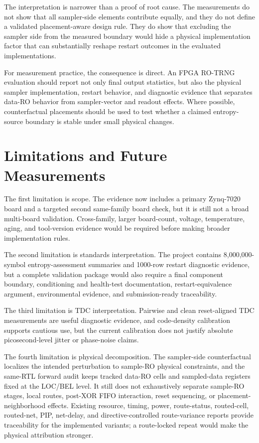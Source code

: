 \documentclass[journal]{IEEEtran}
\newcommand{\rotrng}{RO-TRNG}
\newcommand{\tdc}{TDC}
\begin{document}
The interpretation is narrower than a proof of root cause. The measurements do not show that all sampler-side elements contribute equally, and they do not define a validated placement-aware design rule. They do show that excluding the sampler side from the measured boundary would hide a physical implementation factor that can substantially reshape restart outcomes in the evaluated implementations.

For measurement practice, the consequence is direct. An FPGA \rotrng{} evaluation should report not only final output statistics, but also the physical sampler implementation, restart behavior, and diagnostic evidence that separates data-RO behavior from sampler-vector and readout effects. Where possible, counterfactual placements should be used to test whether a claimed entropy-source boundary is stable under small physical changes.

\section{Limitations and Future Measurements}

The first limitation is scope. The evidence now includes a primary Zynq-7020 board and a targeted second same-family board check, but it is still not a broad multi-board validation. Cross-family, larger board-count, voltage, temperature, aging, and tool-version evidence would be required before making broader implementation rules.

The second limitation is standards interpretation. The project contains 8,000,000-symbol entropy-assessment summaries and 1000-row restart diagnostic evidence, but a complete validation package would also require a final component boundary, conditioning and health-test documentation, restart-equivalence argument, environmental evidence, and submission-ready traceability.

The third limitation is \tdc{} interpretation. Pairwise and clean reset-aligned \tdc{} measurements are useful diagnostic evidence, and code-density calibration supports cautious use, but the current calibration does not justify absolute picosecond-level jitter or phase-noise claims.

The fourth limitation is physical decomposition. The sampler-side counterfactual localizes the intended perturbation to sample-RO physical constraints, and the same-RTL forward audit keeps tracked data-RO cells and sampled-data registers fixed at the LOC/BEL level. It still does not exhaustively separate sample-RO stages, local routes, post-XOR FIFO interaction, reset sequencing, or placement-neighborhood effects. Existing resource, timing, power, route-status, routed-cell, routed-net, PIP, net-delay, and directive-controlled route-variance reports provide traceability for the implemented variants; a route-locked repeat would make the physical attribution stronger.
\end{document}
